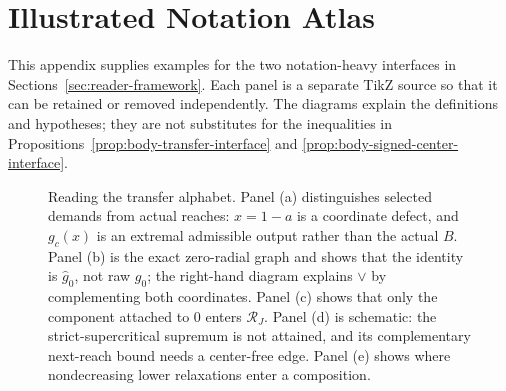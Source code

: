 \section{Illustrated Notation Atlas}
\label{sec:interface-notation-atlas}

This appendix supplies examples for the two notation-heavy interfaces in
Sections~\ref{sec:reader-framework}.  Each panel is a separate TikZ source so
that it can be retained or removed independently.  The diagrams explain the
definitions and hypotheses; they are not substitutes for the inequalities in
Propositions~\ref{prop:body-transfer-interface} and
\ref{prop:body-signed-center-interface}.

\begin{figure}[H]
\centering
\begin{minipage}[t]{.485\textwidth}
\centering
\resizebox{\linewidth}{!}{}
\end{minipage}\hfill
\begin{minipage}[t]{.485\textwidth}
\centering
\resizebox{\linewidth}{!}{}
\end{minipage}

\medskip
\resizebox{.985\linewidth}{!}{}

\medskip
\begin{minipage}[t]{.485\textwidth}
\centering
\resizebox{\linewidth}{!}{}
\end{minipage}\hfill
\begin{minipage}[t]{.485\textwidth}
\centering
\resizebox{\linewidth}{!}{}
\end{minipage}
\caption{Reading the transfer alphabet.  Panel (a) distinguishes selected
demands from actual reaches: $x=1-a$ is a coordinate defect, and $g_c(x)$ is
an extremal admissible output rather than the actual $B$.  Panel (b) is the
exact zero-radial graph and shows that the identity is
$\widehat g_0$, not raw $g_0$; the right-hand diagram explains $\vee$ by
complementing both coordinates.  Panel (c) shows that only the component
attached to $0$ enters $\mathcal R_J$.  Panel (d) is schematic: the
strict-supercritical supremum is not attained, and its complementary
next-reach bound needs a center-free edge.  Panel (e) shows where
nondecreasing lower relaxations enter a composition.}
\label{fig:transfer-notation-atlas}
\end{figure}


